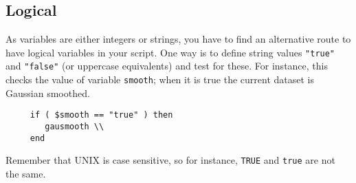 \documentclass[twoside,11pt]{article}
\newcommand{\xlabel}[1]{}
\begin{document}
\newpage
\subsection{\xlabel{sc4_se_logical}Logical\label{sc4_se_logical}}

As variables are either integers or strings, you have to find an
alternative route to have logical variables in your script.  One way is
to define string values {\tt "true"} and {\tt "false"} (or uppercase
equivalents) and test for these.  For instance, this checks the value of
variable {\tt smooth};  when it is true the current dataset is Gaussian
smoothed.

\small
\begin{verbatim}
     if ( $smooth == "true" ) then
        gausmooth \\
     end
\end{verbatim}
\normalsize
Remember that UNIX is case sensitive, so for instance, {\tt TRUE} and
{\tt true} are not the same.
\end{document}
